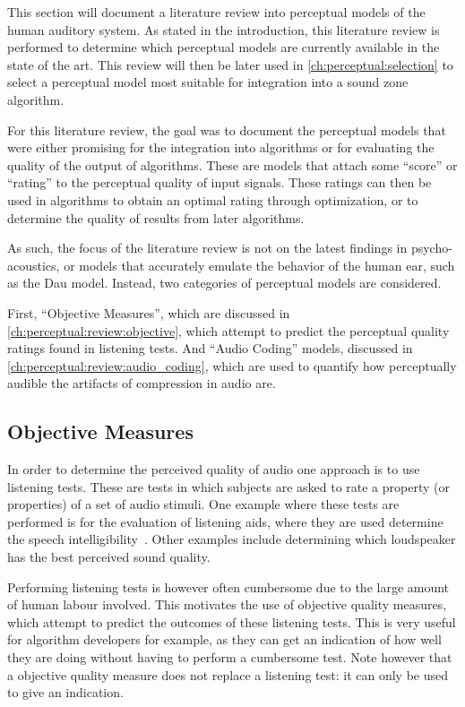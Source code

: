 This section will document a literature review into perceptual models of the human auditory system.
As stated in the introduction, this literature review is performed to determine which perceptual models are currently 
available in the state of the art.
This review will then be later used in \autoref{ch:perceptual:selection} to select a perceptual model most 
suitable for integration into a sound zone algorithm.

For this literature review, the goal was to document the perceptual models that were either promising for 
the integration into algorithms or for evaluating the quality of the output of algorithms.
These are models that attach some ``score'' or ``rating'' to the perceptual quality of input signals.
These ratings can then be used in algorithms to obtain an optimal rating through optimization, or to determine
the quality of results from later algorithms.

As such, the focus of the literature review is not on the latest findings in psycho-acoustics, or models 
that accurately emulate the behavior of the human ear, such as the Dau model.
Instead, two categories of perceptual models are considered.

First, ``Objective Measures'', which are discussed in \autoref{ch:perceptual:review:objective}, which attempt to predict
the perceptual quality ratings found in listening tests. 
And ``Audio Coding'' models, discussed in \autoref{ch:perceptual:review:audio_coding}, which are used to quantify how
perceptually audible the artifacts of compression in audio are.

\subsection{Objective Measures}
\label{ch:perceptual:review:objective}
In order to determine the perceived quality of audio one approach is to use listening tests.
These are tests in which subjects are asked to rate a property (or properties) of a set of audio stimuli.
One example where these tests are performed is for the evaluation of listening aids, where they are used determine 
the speech intelligibility~\cite{taal2011algorithm}.
Other examples include determining which loudspeaker has the best perceived sound quality.

Performing listening tests is however often cumbersome due to the large amount of human labour involved.
This motivates the use of objective quality measures, which attempt to predict the outcomes of these listening tests.
This is very useful for algorithm developers for example, as they can get an indication of how well they are doing
without having to perform a cumbersome test.
Note however that a objective quality measure does not replace a listening test: it can only be used to give an 
indication.

